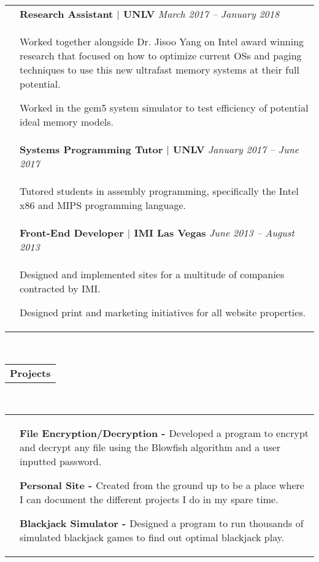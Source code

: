 \documentclass[12pt]{article}
\begin{document}
\begin{tabular}[b]{p{1.3cm} p{14.4cm}}
	& {\bf{Research Assistant $|$ UNLV}} \hfill \emph{\footnotesize{March 2017 -- January 2018}}
    \\ & \small{ \begin{compactitem}
    	\item Worked together alongside Dr. Jisoo Yang on Intel award winning research that focused on how to optimize current OSs and paging techniques to use this new ultrafast memory systems at their full potential.
    	\item Worked in the gem5 system simulator to test efficiency of potential ideal memory models.
	\end{compactitem}}  \\
    & {\bf{Systems Programming Tutor $|$ UNLV}} \hfill \emph{\footnotesize{January 2017 -- June 2017}}
    \\ & \small{ \begin{compactitem}
    	\item Tutored students in assembly programming, specifically the Intel x86 and MIPS programming language.
	\end{compactitem}} \smallskip \\
    & {\bf{Front-End Developer $|$ IMI Las Vegas}} \hfill \emph{\footnotesize{June 2013 -- August 2013}}
    \\ & \small{\begin{compactitem}
    	\item Designed and implemented sites for a multitude of companies contracted by IMI.
        \item Designed print and marketing initiatives for all website properties.
	\end{compactitem}}
\end{tabular} \\
\raggedright{\begin{tabular}[b]{p{5.5cm}}
	\bf{\Large{Projects}} \\
    \cline{1-1}
\end{tabular}} \\
	\begin{tabular}[b]{p{.6cm} p{14.4cm}}
	&
    \begin{compactitem}
    	\item \small{\bf{File Encryption/Decryption - }}Developed a program to encrypt and decrypt any file using the Blowfish algorithm and a user inputted password.
	\end{compactitem} \medskip
    \begin{compactitem}
        \item \small{\bf{Personal Site - }}Created from the ground up to be a place where I can document the different projects I do in my spare time.
	\end{compactitem} \medskip
    \begin{compactitem}
        \item \small{\bf{Blackjack Simulator - }}Designed a program to run thousands of simulated blackjack games to find out optimal blackjack play.
	\end{compactitem}
\end{tabular} \\ \medskip
\end{document}
